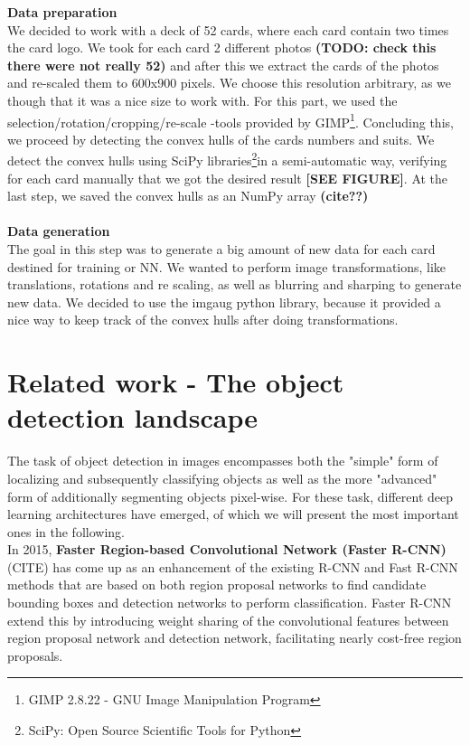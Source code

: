 \documentclass[a4paper]{article}
\begin{document}
\large \textbf{Data preparation} \\
\normalsize
We decided to work with a deck of 52 cards, where each card contain two times the card logo.  We took for each card 2 different photos \textbf{(TODO: check this there were not really 52)} and after this we extract the cards of the photos and re-scaled them to 600x900 pixels.  We choose this resolution arbitrary, as we though that it was a nice size to work with.
For this part, we used the selection/rotation/cropping/re-scale -tools provided by GIMP\footnote{GIMP 2.8.22 - GNU Image Manipulation Program}.
Concluding this, we proceed by detecting the convex hulls of the cards numbers and suits.  We detect the convex hulls using SciPy libraries\footnote{SciPy: Open Source Scientific Tools for Python}in a semi-automatic way, verifying for each card manually that we got the desired result \textbf{[SEE FIGURE]}.
At the last step, we saved the convex hulls as an NumPy array \textbf{(cite??)} \\ \\
\large \textbf{Data generation} \\
\normalsize
The goal in this step was to generate a big amount of new data for each card destined for training or NN. We wanted to perform image transformations, like translations, rotations and re scaling, as well as blurring and sharping to generate new data.  We decided to use the imgaug python library, because it provided a nice way to keep track of the convex hulls after doing transformations. 
\section{Related work - The object detection landscape}
The task of object detection in images encompasses both the "simple" form of localizing and subsequently classifying objects as well as the more "advanced" form of additionally segmenting objects pixel-wise. For these task, different deep learning architectures have emerged, of which we will present the most important ones in the following.\\ In 2015, \textbf{Faster Region-based Convolutional Network (Faster R-CNN)} (CITE) has come up as an enhancement of the existing R-CNN and Fast R-CNN methods that are based on both region proposal networks to find candidate bounding boxes and detection networks to perform classification. Faster R-CNN extend this by introducing weight sharing  of the convolutional features between region proposal network and detection network, facilitating nearly cost-free region proposals. 
\end{document}
